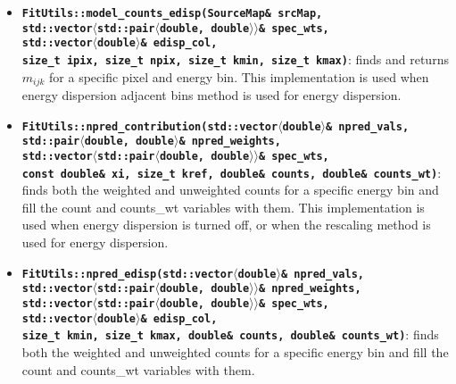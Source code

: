 \documentclass[preprint]{aastex}
\begin{document}
\begin{itemize}
{    energy dispersion.}
\item{ {\bf {\tt FitUtils::model\_counts\_edisp(SourceMap\& srcMap,\\ \hspace{1in}
        std::vector$\langle$std::pair$\langle$double, double$\rangle\rangle$\& spec\_wts, \\ \hspace{1in}
        std::vector$\langle$double$\rangle$\& edisp\_col, \\ \hspace{1in}
        size\_t ipix, size\_t npix, size\_t kmin, size\_t kmax)}}: finds 
    and returns $m_{ijk}$ for a specific pixel and energy bin.  This implementation
    is used when energy dispersion adjacent bins method is used for energy dispersion.}
\item{ {\bf {\tt FitUtils::npred\_contribution(std::vector$\langle$double$\rangle$\& npred\_vals, \\ \hspace{1in}
        std::pair$\langle$double, double$\rangle$\& npred\_weights,  \\ \hspace{1in}
        std::vector$\langle$std::pair$\langle$double, double$\rangle\rangle$\& spec\_wts, \\ \hspace{1in} 
        const double\& xi, size\_t kref, double\& counts, double\& counts\_wt)}}: finds 
    both the weighted and unweighted counts for a specific energy bin and fill the count and counts\_wt variables with them. 
    This implementation is used when energy dispersion is turned off, or when the rescaling method is used for 
    energy dispersion.}
\item{ {\bf {\tt FitUtils::npred\_edisp(std::vector$\langle$double$\rangle$\& npred\_vals, \\ \hspace{1in}
        std::vector$\langle$std::pair$\langle$double, double$\rangle\rangle$\& npred\_weights, \\ \hspace{1in}
        std::vector$\langle$std::pair$\langle$double, double$\rangle\rangle$\& spec\_wts, \\ \hspace{1in}
        std::vector$\langle$double$\rangle$\& edisp\_col,\\ \hspace{1in}
        size\_t kmin, size\_t kmax, double\& counts, double\& counts\_wt)}}: finds 
    both the weighted and unweighted counts for a specific energy bin and fill the count and counts\_wt variables with them. 
}
\end{itemize}
\end{document}

